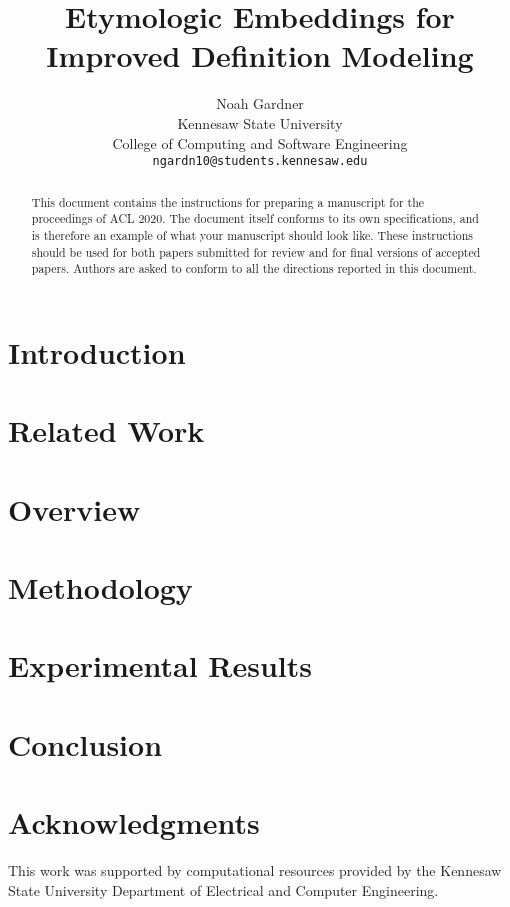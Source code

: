 \documentclass[11pt,a4paper]{article}
\title{Etymologic Embeddings for Improved Definition Modeling}
\author{Noah Gardner \\
  Kennesaw State University \\
  College of Computing and Software Engineering \\
  \texttt{ngardn10@students.kennesaw.edu} \\}
\begin{document}
\maketitle
\begin{abstract}
  This document contains the instructions for preparing a manuscript for the
  proceedings of ACL 2020. The document itself conforms to its own
  specifications, and is therefore an example of what your manuscript should
  look like. These instructions should be used for both papers submitted for
  review and for final versions of accepted papers. Authors are asked to conform
  to all the directions reported in this document.
\end{abstract}

\section{Introduction}
\citet{wu_computational_2020}

\section{Related Work}

\section{Overview}

\section{Methodology}

\section{Experimental Results}

\section{Conclusion}

\section*{Acknowledgments}
This work was supported by computational resources provided by the Kennesaw
State University Department of Electrical and Computer Engineering.



\end{document}

